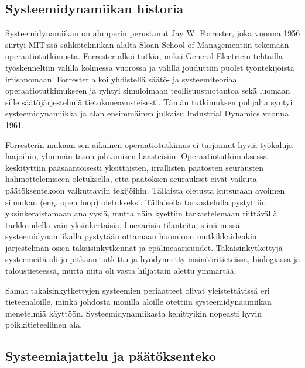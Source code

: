 \documentclass[finnish,12pt,a4paper,pdftex]{article}
\begin{document}
\begin{onehalfspacing}
\subsection{Systeemidynamiikan historia \label{sysdyn:historia}} 


Systeemidynamiikan on alunperin perustanut Jay W. Forrester, joka vuonna 1956 siirtyi MIT:ssä sähkötekniikan alalta Sloan School of Managementiin tekemään operaatiotutkimusta. Forrester alkoi tutkia, miksi General Electricin tehtailla työskenneltiin välillä kolmessa vuorossa ja välillä jouduttiin puolet työntekijöistä irtisanomaan. Forrester alkoi yhdistellä säätö- ja systeemiteoriaa operaatiotutkimukseen ja ryhtyi simuloimaan teollisuustuotantoa sekä luomaan sille säätöjärjestelmiä tietokoneavusteisesti. Tämän tutkimuksen pohjalta syntyi systeemidynamiikka ja alan ensimmäinen julkaisu Industrial Dynamics \cite{Forrester1961} vuonna 1961. \cite{Forrester1989} 

Forresterin \cite[s. 398--399]{Forrester1968} mukaan sen aikainen operaatiotutkimus ei tarjonnut hyviä työkaluja laajoihin, ylimmän tason johtamisen haasteisiin. Operaatiotutkimuksessa keskityttiin pääsääntöisesti yksittäisten, irrallisten päätösten seurausten hahmottelemiseen oletuksella, että päätöksen seuraukset eivät vaikuta päätöksentekoon vaikuttaviin tekijöihin. Tällaista oletusta kutsutaan avoimen silmukan (eng. open loop) oletukseksi. Tällaisella tarkastelulla pystyttiin yksinkeraistamaan analyysiä, mutta näin kyettiin tarkastelemaan riittävällä tarkkuudella vain yksinkertaisia, lineaarisia tilanteita, siinä missä systeemidynamiikalla pystytään ottamaan huomioon mutkikkaidenkin järjestelmän osien takaisinkytkennät ja epälineaarisuudet. Takaisinkytkettyjä systeemeitä oli jo pitkään tutkittu ja hyödynnetty insinööritieteissä, biologiassa ja taloustieteessä, mutta niitä oli vasta hiljattain alettu ymmärtää. 

Samat takaisinkytkettyjen systeemien periaatteet olivat yleistettävissä eri tieteenaloille, minkä johdosta monilla aloille otettiin systeemidynaamiikan menetelmiä käyttöön. Systeemidynamiikasta kehittyikin nopeasti hyvin poikkitieteellinen ala. \cite{WhatIsSystemDynamics, Forrester1968, Sterman2000} 

\subsection{Systeemiajattelu ja päätöksenteko \label{sysdyn:paatos}}


\end{onehalfspacing}
\end{document}
